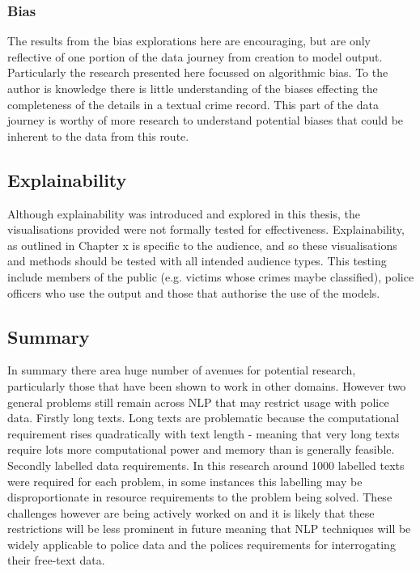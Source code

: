 \subsubsection{Bias} The results from the bias explorations here are encouraging, but are only reflective of one portion of the data journey from creation to model output. Particularly the research presented here focussed on algorithmic bias. To the author is knowledge there is little understanding of the biases effecting the completeness of the details in a textual crime record. This part of the data journey is worthy of more research to understand potential biases that could be inherent to the data from this route.

\subsection{Explainability} Although explainability was introduced and explored in this thesis, the visualisations provided were not formally tested for effectiveness. Explainability, as outlined in Chapter x is specific to the audience, and so these visualisations and methods should be tested with all intended audience types. This testing include members of the public (e.g. victims whose crimes maybe classified), police officers who use the output and those that authorise the use of the models. 

\subsection{Summary} In summary there area huge number of avenues for potential research, particularly those that have been shown to work in other domains. However two general problems still remain across NLP that may restrict usage with police data. Firstly long texts. Long texts are problematic because the computational requirement rises quadratically with text length - meaning that very long texts require lots more computational power and memory than is generally feasible. Secondly labelled data requirements. In this research around 1000 labelled texts were required for each problem, in some instances this labelling may be disproportionate in resource requirements to the problem being solved.  These challenges however are being actively worked on and it is likely that these restrictions will be less prominent in future meaning that NLP techniques will be widely applicable to police data and the polices requirements for interrogating their free-text data.


